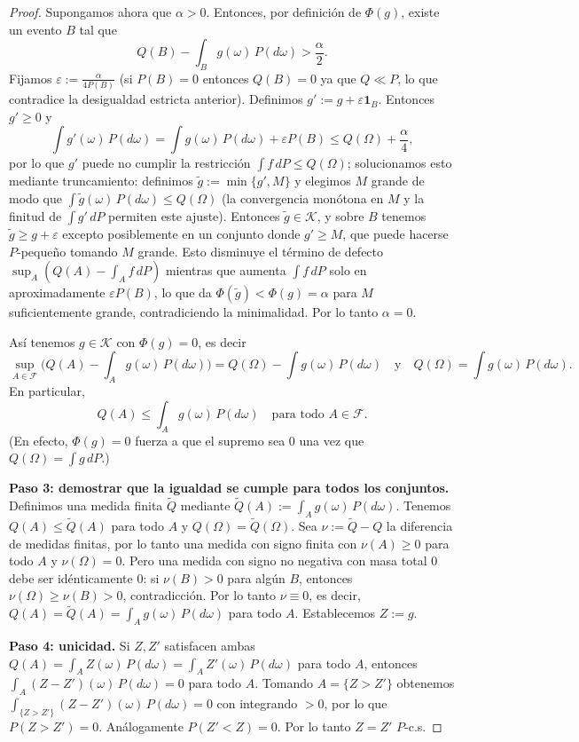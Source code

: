 \documentclass[11pt,a4paper]{article}
\theoremstyle{plain}
\theoremstyle{definition}
\theoremstyle{remark}
\newcommand{\1}{\mathbf{1}}
\newcommand{\cF}{\mathcal{F}}
\begin{document}
\begin{proof}
Supongamos ahora que $\alpha>0$. Entonces, por definición de $\Phi(g)$, existe un evento $B$ tal que
\[
Q(B)-\int_B g(\omega)\,P(d\omega) > \frac{\alpha}{2}.
\]
Fijamos $\varepsilon:=\frac{\alpha}{4P(B)}$ (si $P(B)=0$ entonces $Q(B)=0$ ya que $Q\ll P$, lo que contradice la desigualdad estricta anterior). Definimos $g':=g+\varepsilon \1_B$.
Entonces $g'\ge0$ y
\[
\int g'(\omega)\,P(d\omega) = \int g(\omega)\,P(d\omega)+\varepsilon P(B)\le Q(\Omega)+\frac{\alpha}{4},
\]
por lo que $g'$ puede no cumplir la restricción $\int f\,dP\le Q(\Omega)$; solucionamos esto mediante truncamiento:
definimos $\tilde g:=\min\{g',M\}$ y elegimos $M$ grande de modo que $\int \tilde g(\omega)\,P(d\omega)\le Q(\Omega)$ (la convergencia monótona en $M$ y la finitud de $\int g'\,dP$ permiten este ajuste).
Entonces $\tilde g\in\mathcal{K}$, y sobre $B$ tenemos $\tilde g\ge g+\varepsilon$ excepto posiblemente en un conjunto donde $g'\ge M$, que puede hacerse $P$-pequeño tomando $M$ grande. Esto disminuye el término de defecto $\sup_A(Q(A)-\int_A f\,dP)$ mientras que aumenta $\int f\,dP$ solo en aproximadamente $\varepsilon P(B)$, lo que da $\Phi(\tilde g) < \Phi(g)=\alpha$ para $M$ suficientemente grande, contradiciendo la minimalidad. Por lo tanto $\alpha=0$.

Así tenemos $g\in\mathcal{K}$ con $\Phi(g)=0$, es decir
\[
\sup_{A\in\cF}\Big(Q(A)-\int_A g(\omega)\,P(d\omega)\Big)=Q(\Omega)-\int g(\omega)\,P(d\omega)
\quad\text{y}\quad
Q(\Omega)=\int g(\omega)\,P(d\omega).
\]
En particular,
\[
Q(A)\le \int_A g(\omega)\,P(d\omega) \quad\text{para todo }A\in\cF.
\]
(En efecto, $\Phi(g)=0$ fuerza a que el supremo sea $0$ una vez que $Q(\Omega)=\int g\,dP$.)

\smallskip
\noindent\textbf{Paso 3: demostrar que la igualdad se cumple para todos los conjuntos.}
Definimos una medida finita $\tilde Q$ mediante $\tilde Q(A):=\int_A g(\omega)\,P(d\omega)$.
Tenemos $Q(A)\le \tilde Q(A)$ para todo $A$ y $Q(\Omega)=\tilde Q(\Omega)$.
Sea $\nu:=\tilde Q-Q$ la diferencia de medidas finitas, por lo tanto una medida con signo finita con $\nu(A)\ge0$ para todo $A$ y $\nu(\Omega)=0$.
Pero una medida con signo no negativa con masa total $0$ debe ser idénticamente $0$: si $\nu(B)>0$ para algún $B$, entonces $\nu(\Omega)\ge \nu(B)>0$, contradicción.
Por lo tanto $\nu\equiv0$, es decir, $Q(A)=\tilde Q(A)=\int_A g(\omega)\,P(d\omega)$ para todo $A$.
Establecemos $Z:=g$.

\smallskip
\noindent\textbf{Paso 4: unicidad.}
Si $Z,Z'$ satisfacen ambas $Q(A)=\int_A Z(\omega)\,P(d\omega)=\int_A Z'(\omega)\,P(d\omega)$ para todo $A$, entonces $\int_A (Z-Z')(\omega)\,P(d\omega)=0$ para todo $A$.
Tomando $A=\{Z>Z'\}$ obtenemos $\int_{\{Z>Z'\}} (Z-Z')(\omega)\,P(d\omega)=0$ con integrando $>0$, por lo que $P(Z>Z')=0$. Análogamente $P(Z'<Z)=0$. Por lo tanto $Z=Z'$ $P$-c.s.
\end{proof}
\end{document}
